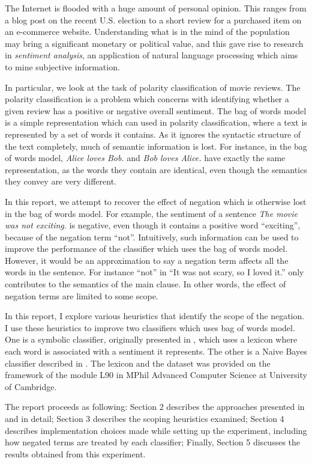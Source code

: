 The Internet is flooded with a huge amount of personal opinion. This ranges from a blog post on the recent U.S. election to a short review for a purchased item on an e-commerce website. Understanding what is in the mind of the population may bring a significant monetary or political value, and this gave rise to research in {\em sentiment analysis}, an application of natural language processing which aims to mine subjective information.

In particular, we look at the task of polarity classification of movie reviews. The polarity classification is a problem which concerns with identifying whether a given review has a positive or negative overall sentiment. The bag of words model is a simple representation which can used in polarity classification, where a text is represented by a set of words it contains. As it ignores the syntactic structure of the text completely, much of semantic information is lost. For instance, in the bag of words model, \textit{Alice loves Bob.} and \textit{Bob loves Alice.} have exactly the same representation, as the words they contain are identical, even though the semantics they convey are very different.

In this report, we attempt to recover the effect of negation which is otherwise lost in the bag of words model. For example, the sentiment of a sentence \textit{The movie was not exciting.} is negative, even though it contains a positive word ``exciting'', because of the negation term ``not''. Intuitively, such information can be used to improve the performance of the classifier which uses the bag of words model. However, it would be an approximation to say a negation term affects all the words in the sentence. For instance ``not'' in ``It was not scary, so I loved it.'' only contributes to the semantics of the main clause. In other words, the effect of negation terms are limited to some scope.

In this report, I explore various heuristics that identify the scope of the negation. I use these heuristics to improve two classifiers which uses bag of words model. One is a symbolic classifier, originally presented in \cite{wilson2005recognizing}, which uses a lexicon where each word is associated with a sentiment it represents. The other is a Naive Bayes classifier described in \cite{pang2002thumbs}. The lexicon and the dataset was provided on the framework of the module L90 in MPhil Advanced Computer Science at University of Cambridge.

The report proceeds as following: Section 2 describes the approaches presented in \cite{wilson2005recognizing} and \cite{pang2002thumbs} in detail; Section 3 describes the scoping heuristics examined; Section 4 describes implementation choices made while setting up the experiment, including how negated terms are treated by each classifier; Finally, Section 5 discusses the results obtained from this experiment.

